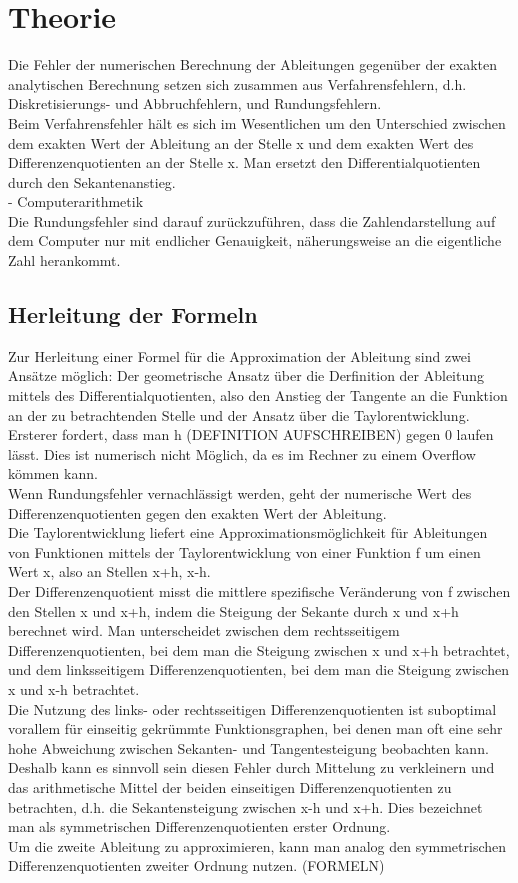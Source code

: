 \documentclass{scrartcl}
\begin{document}
\pagebreak \section{Theorie}
\label{sec:theorie}
Die Fehler der numerischen Berechnung der Ableitungen gegenüber der exakten analytischen Berechnung setzen sich zusammen aus Verfahrensfehlern, d.h. Diskretisierungs- und Abbruchfehlern, und Rundungsfehlern.\\
Beim Verfahrensfehler hält es sich im Wesentlichen um den Unterschied zwischen dem exakten Wert der Ableitung an der Stelle x und dem exakten Wert des Differenzenquotienten an der Stelle x. Man ersetzt den Differentialquotienten durch den Sekantenanstieg.\\
- Computerarithmetik\\
Die Rundungsfehler sind darauf zurückzuführen, dass die Zahlendarstellung auf dem Computer nur mit endlicher Genauigkeit, näherungsweise an die eigentliche Zahl herankommt.

\subsection{Herleitung der Formeln}
\label{ssec:herleitung}
Zur Herleitung einer Formel für die Approximation der Ableitung sind zwei Ansätze möglich: Der geometrische Ansatz über die Derfinition der Ableitung mittels des Differentialquotienten, also den Anstieg der Tangente an die Funktion an der zu betrachtenden Stelle und der Ansatz über die Taylorentwicklung. Ersterer fordert, dass man h (DEFINITION AUFSCHREIBEN) gegen 0 laufen lässt. Dies ist numerisch nicht Möglich, da es im Rechner zu einem Overflow kömmen kann.\\
Wenn Rundungsfehler vernachlässigt werden, geht der numerische Wert des Differenzenquotienten gegen den exakten Wert der Ableitung. \\
Die Taylorentwicklung liefert eine Approximationsmöglichkeit für Ableitungen von Funktionen mittels der Taylorentwicklung von einer Funktion f um einen Wert x, also an Stellen x+h, x-h.\\
Der Differenzenquotient misst die mittlere spezifische Veränderung von f zwischen den Stellen x und x+h, indem die Steigung der Sekante durch x und x+h berechnet wird. Man unterscheidet zwischen dem rechtsseitigem Differenzenquotienten, bei dem man die Steigung zwischen x und x+h betrachtet, und dem linksseitigem Differenzenquotienten, bei dem man die Steigung zwischen x und x-h betrachtet.\\
Die Nutzung des links- oder rechtsseitigen Differenzenquotienten ist suboptimal vorallem für einseitig gekrümmte Funktionsgraphen, bei denen man oft eine sehr hohe Abweichung zwischen Sekanten- und Tangentesteigung beobachten kann. Deshalb kann es sinnvoll sein diesen Fehler durch Mittelung zu verkleinern und das arithmetische Mittel der beiden einseitigen Differenzenquotienten zu betrachten, d.h. die Sekantensteigung zwischen x-h und x+h. Dies bezeichnet man als symmetrischen Differenzenquotienten erster Ordnung.\\
Um die zweite Ableitung zu approximieren, kann man analog den symmetrischen Differenzenquotienten zweiter Ordnung nutzen. (FORMELN)\\
\end{document}
